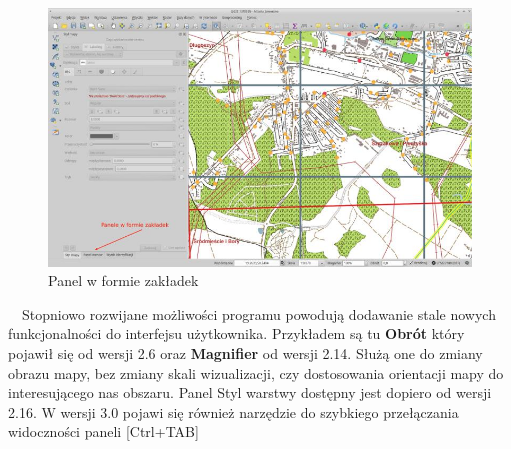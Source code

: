 \documentclass[12pt,a4paper]{book}
\begin{document}
\begin{figure}[!ht]
	\centering
	\includegraphics[scale=0.45]{001-zakladki.jpg}
	\caption{Panel w formie zakładek}
\end{figure}

\ \ Stopniowo rozwijane możliwości programu powodują dodawanie stale nowych funkcjonalności do interfejsu użytkownika. Przykładem są tu \textbf{Obrót} który pojawił się od wersji 2.6 oraz \textbf{Magnifier} od wersji 2.14. Służą one do zmiany obrazu mapy, bez zmiany skali wizualizacji, czy dostosowania orientacji mapy do interesującego nas obszaru. Panel Styl warstwy dostępny jest dopiero od wersji 2.16. 
W wersji 3.0 pojawi się również narzędzie do szybkiego przełączania widoczności paneli [Ctrl+TAB]
\end{document}
